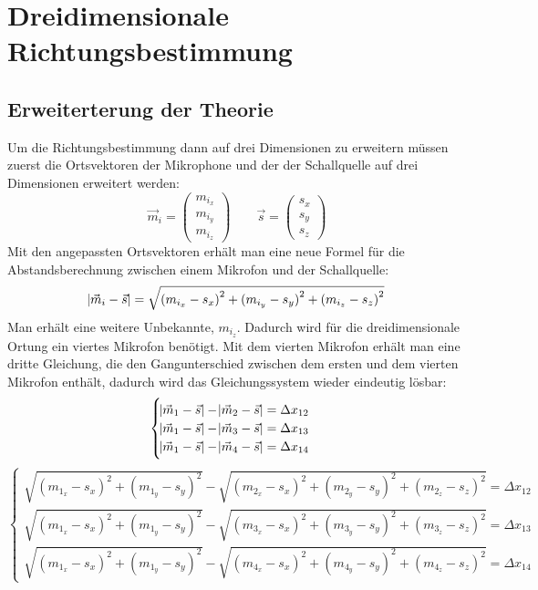 \section{Dreidimensionale Richtungsbestimmung} 
\subsection{Erweiterterung der Theorie}
Um die Richtungsbestimmung dann auf drei Dimensionen zu erweitern müssen zuerst die Ortsvektoren der Mikrophone und der der Schallquelle auf drei Dimensionen erweitert werden: $$\vec{m}_i = \begin{pmatrix}
m_{i_x} \\
m_{i_y} \\
m_{i_z}
\end{pmatrix} \quad\quad
\vec{s} = \begin{pmatrix}
{s_x} \\
{s_y} \\
{s_z}
\end{pmatrix}$$
Mit den angepassten Ortsvektoren erhält man eine neue Formel für die Abstandsberechnung zwischen einem Mikrofon und der Schallquelle:
$$\abs{\vec{m}_i - \vec{s}} = \sqrt{{(m_{i_x} - s_x)}^2 + {(m_{i_y} - s_y)}^2 + {(m_{i_z} - s_z)}^2}$$
Man erhält eine weitere Unbekannte, $m_{i_z}$. Dadurch wird für die dreidimensionale Ortung ein viertes Mikrofon benötigt. Mit dem vierten Mikrofon erhält man eine dritte Gleichung, die den Gangunterschied zwischen dem ersten und dem vierten Mikrofon enthält, dadurch wird das Gleichungssystem wieder eindeutig lösbar:
$$\begin{cases}
\abs{\vec{m}_1 - \vec{s}} - \abs{\vec{m}_2 - \vec{s}} = \Delta{x_{12}} \\
\abs{\vec{m}_1 - \vec{s}} - \abs{\vec{m}_3 - \vec{s}} = \Delta{x_{13}} \\
\abs{\vec{m}_1 - \vec{s}} - \abs{\vec{m}_4 - \vec{s}} = \Delta{x_{14}}
\end{cases}$$
$$\begin{cases}
\sqrt{{(m_{1_x} - s_x)}^2 + {(m_{1_y} - s_y)}^2} - \sqrt{{(m_{2_x} - s_x)}^2 + {(m_{2_y} - s_y)}^2 + {(m_{2_z} - s_z)}^2} = \Delta{x_{12}} \\
\sqrt{{(m_{1_x} - s_x)}^2 + {(m_{1_y} - s_y)}^2} - \sqrt{{(m_{3_x} - s_x)}^2 + {(m_{3_y} - s_y)}^2 + {(m_{3_z} - s_z)}^2} = \Delta{x_{13}} \\
\sqrt{{(m_{1_x} - s_x)}^2 + {(m_{1_y} - s_y)}^2} - \sqrt{{(m_{4_x} - s_x)}^2 + {(m_{4_y} - s_y)}^2 + {(m_{4_z} - s_z)}^2} = \Delta{x_{14}}
\end{cases}$$
